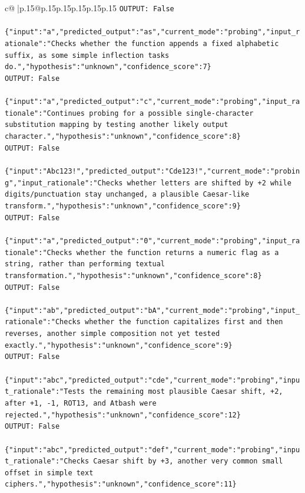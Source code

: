 \documentclass{article}
\begin{document}
{\begin{supertabular}{c@{$\;$}|p{.15\linewidth}@{}p{.15\linewidth}p{.15\linewidth}p{.15\linewidth}p{.15\linewidth}p{.15\linewidth}}
{{{\texttt{OUTPUT: False} \\
\\ 
\texttt{\{"input":"a","predicted\_output":"as","current\_mode":"probing","input\_rationale":"Checks whether the function appends a fixed alphabetic suffix, as some simple inflection tasks do.","hypothesis":"unknown","confidence\_score":7\}} \\
\texttt{OUTPUT: False} \\
\\ 
\texttt{\{"input":"a","predicted\_output":"c","current\_mode":"probing","input\_rationale":"Continues probing for a possible single{-}character substitution mapping by testing another likely output character.","hypothesis":"unknown","confidence\_score":8\}} \\
\texttt{OUTPUT: False} \\
\\ 
\texttt{\{"input":"Abc123!","predicted\_output":"Cde123!","current\_mode":"probing","input\_rationale":"Checks whether letters are shifted by +2 while digits/punctuation stay unchanged, a plausible Caesar{-}like transform.","hypothesis":"unknown","confidence\_score":9\}} \\
\texttt{OUTPUT: False} \\
\\ 
\texttt{\{"input":"a","predicted\_output":"0","current\_mode":"probing","input\_rationale":"Checks whether the function returns a numeric flag as a string, rather than performing textual transformation.","hypothesis":"unknown","confidence\_score":8\}} \\
\texttt{OUTPUT: False} \\
\\ 
\texttt{\{"input":"ab","predicted\_output":"bA","current\_mode":"probing","input\_rationale":"Checks whether the function capitalizes first and then reverses, another simple composition not yet tested exactly.","hypothesis":"unknown","confidence\_score":9\}} \\
\texttt{OUTPUT: False} \\
\\ 
\texttt{\{"input":"abc","predicted\_output":"cde","current\_mode":"probing","input\_rationale":"Tests the remaining most plausible Caesar shift, +2, after +1, {-}1, ROT13, and Atbash were rejected.","hypothesis":"unknown","confidence\_score":12\}} \\
\texttt{OUTPUT: False} \\
\\ 
\texttt{\{"input":"abc","predicted\_output":"def","current\_mode":"probing","input\_rationale":"Checks Caesar shift by +3, another very common small offset in simple text ciphers.","hypothesis":"unknown","confidence\_score":11\}} \\
}}}
\end{supertabular}}
\end{document}
